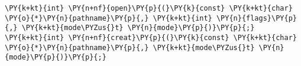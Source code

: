 \begin{Verbatim}[commandchars=\\\{\}]
\PY{k+kt}{int} \PY{n+nf}{open}\PY{p}{(}\PY{k}{const} \PY{k+kt}{char} \PY{o}{*}\PY{n}{pathname}\PY{p}{,} \PY{k+kt}{int} \PY{n}{flags}\PY{p}{,} \PY{k+kt}{mode\PYZus{}t} \PY{n}{mode}\PY{p}{)}\PY{p}{;}
\PY{k+kt}{int} \PY{n+nf}{creat}\PY{p}{(}\PY{k}{const} \PY{k+kt}{char} \PY{o}{*}\PY{n}{pathname}\PY{p}{,} \PY{k+kt}{mode\PYZus{}t} \PY{n}{mode}\PY{p}{)}\PY{p}{;}
\end{Verbatim}
